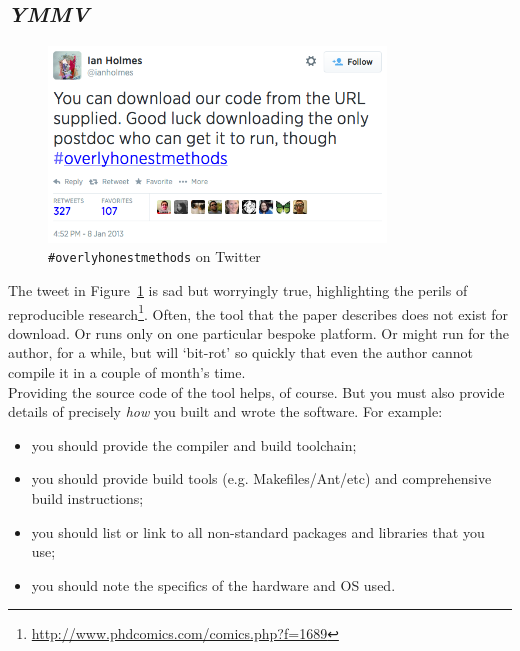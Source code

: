\documentclass[a4paper,11pt]{article}
\begin{document}
\subsection{{\emph{YMMV}}}

\begin{figure}[!ht]
\centering
\includegraphics[width=0.8\textwidth]{images/overlyhonesttweet.png}
\caption{{\texttt{\#overlyhonestmethods}} on Twitter}
\label{fig:overlyhonestmethod} 
\end{figure}

The tweet in Figure~\ref{fig:overlyhonestmethod} is sad but worryingly
true, highlighting the perils of reproducible
research\footnote{\url{http://www.phdcomics.com/comics.php?f=1689}}. Often,
the tool that the paper describes does not exist for download. Or runs
only on one particular bespoke platform. Or might run for the author,
for a while, but will `bit-rot' so quickly that even the author cannot
compile it in a couple of month's time.\\

 Providing the
source code of the tool helps, of course. But you must also provide
details of precisely \emph{how} you built and wrote the software. For
example:

\begin{itemize}
\item you should provide the compiler and build toolchain; 
\item you should provide build tools (e.g. Makefiles/Ant/etc) and
  comprehensive build instructions; 
\item you should list or link to all non-standard packages and libraries that you use; 
\item you should note the specifics of the hardware and OS used. 
\end{itemize}
\end{document}
